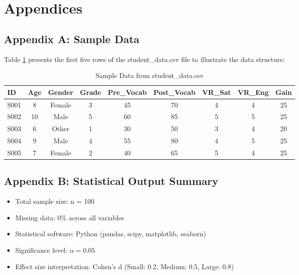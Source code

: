\documentclass[12pt,a4paper]{article}
\begin{document}
\section{Appendices}

\subsection{Appendix A: Sample Data}

Table \ref{tab:sample} presents the first five rows of the student\_data.csv file to illustrate the data structure:

\begin{table}[H]
\centering
\caption{Sample Data from student\_data.csv}
\label{tab:sample}
\scriptsize
\begin{tabular}{lcccccccc}
\toprule
\textbf{ID} & \textbf{Age} & \textbf{Gender} & \textbf{Grade} & \textbf{Pre\_Vocab} & \textbf{Post\_Vocab} & \textbf{VR\_Sat} & \textbf{VR\_Eng} & \textbf{Gain} \\
\midrule
S001 & 8 & Female & 3 & 45 & 70 & 4 & 4 & 25 \\
S002 & 10 & Male & 5 & 60 & 85 & 5 & 5 & 25 \\
S003 & 6 & Other & 1 & 30 & 50 & 3 & 4 & 20 \\
S004 & 9 & Male & 4 & 55 & 80 & 4 & 5 & 25 \\
S005 & 7 & Female & 2 & 40 & 65 & 5 & 4 & 25 \\
\bottomrule
\end{tabular}
\end{table}

\subsection{Appendix B: Statistical Output Summary}

\begin{itemize}
    \item Total sample size: n = 100
    \item Missing data: 0\% across all variables
    \item Statistical software: Python (pandas, scipy, matplotlib, seaborn)
    \item Significance level: $\alpha = 0.05$
    \item Effect size interpretation: Cohen's d (Small: 0.2, Medium: 0.5, Large: 0.8)
\end{itemize}



\end{document}
